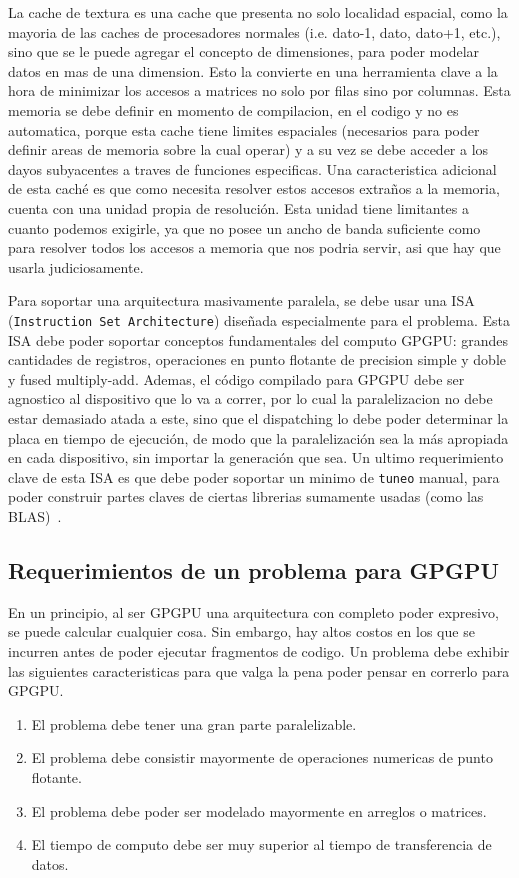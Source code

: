 La cache de textura es una cache que presenta no solo localidad espacial, como la mayoria
de las caches de procesadores normales (i.e. dato-1, dato, dato+1, etc.), sino que se le
puede agregar el concepto de dimensiones, para poder modelar datos en mas de una dimension.
Esto la convierte en una herramienta clave a la hora de minimizar los accesos a matrices
no solo por filas sino por columnas. Esta memoria se debe definir en momento de compilacion,
en el codigo y no es automatica, porque esta cache tiene limites espaciales (necesarios
para poder definir areas de memoria sobre la cual operar) y a su vez se debe acceder
a los dayos subyacentes a traves de funciones especificas. Una caracteristica adicional
de esta cach\'e es que como necesita resolver estos accesos extra\~nos a la memoria, cuenta
con una unidad propia de resoluci\'on. Esta unidad tiene limitantes a cuanto podemos
exigirle, ya que no posee un ancho de banda suficiente como para resolver todos los
accesos a memoria que nos podria servir, asi que hay que usarla judiciosamente.

Para soportar una arquitectura masivamente paralela, se debe usar una ISA
(\texttt{Instruction Set Architecture}) dise\~nada especialmente para el problema. Esta ISA
debe poder soportar conceptos fundamentales del computo GPGPU: grandes cantidades de registros,
operaciones en punto flotante de precision simple y doble y fused multiply-add. Ademas,
el c\'odigo compilado para GPGPU debe ser agnostico al dispositivo que lo va a correr, por
lo cual la paralelizacion no debe estar demasiado atada a este, sino que el dispatching
lo debe poder determinar la placa en tiempo de ejecuci\'on, de modo que la paralelizaci\'on
sea la m\'as apropiada en cada dispositivo, sin importar la generaci\'on que sea. Un ultimo
requerimiento clave de esta ISA es que debe poder soportar un minimo de \texttt{tuneo} manual,
para poder construir partes claves de ciertas librerias sumamente usadas (como las BLAS)~\cite{NvidiaFermi}.


\subsection{Requerimientos de un problema para GPGPU}
En un principio, al ser GPGPU una arquitectura con completo poder expresivo, se puede
calcular cualquier cosa. Sin embargo, hay altos costos en los que se incurren antes de
poder ejecutar fragmentos de codigo. Un problema debe exhibir las siguientes caracteristicas
para que valga la pena poder pensar en correrlo para GPGPU.
\begin{enumerate}
  \item \label{req:paralelo} El problema debe tener una gran parte paralelizable.
  \item \label{req:float} El problema debe consistir mayormente de operaciones numericas de punto flotante.
  \item \label{req:matrix} El problema debe poder ser modelado mayormente en arreglos o matrices.
  \item \label{req:transf} El tiempo de computo debe ser muy superior al tiempo de transferencia de datos.
\end{enumerate}

